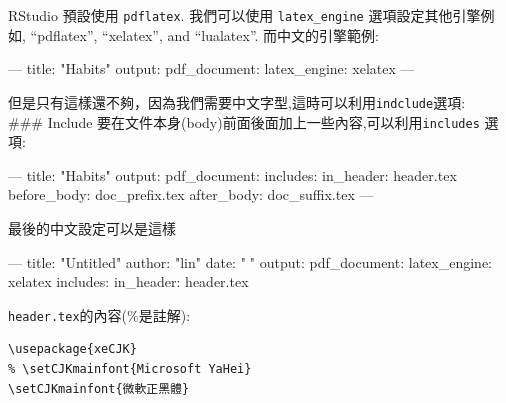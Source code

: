 \documentclass[]{book}
\newenvironment{Shaded}{\begin{snugshade}}{\end{snugshade}}
\newcommand{\AttributeTok}[1]{\textcolor[rgb]{0.77,0.63,0.00}{#1}}
\newcommand{\FunctionTok}[1]{\textcolor[rgb]{0.00,0.00,0.00}{#1}}
\newcommand{\OtherTok}[1]{\textcolor[rgb]{0.56,0.35,0.01}{#1}}
\newcommand{\StringTok}[1]{\textcolor[rgb]{0.31,0.60,0.02}{#1}}
\theoremstyle{definition}
\theoremstyle{definition}
\theoremstyle{definition}
\theoremstyle{remark}
\begin{document}
RStudio 預設使用 \texttt{pdflatex}. 我們可以使用 \texttt{latex\_engine}
選項設定其他引擎例如, ``pdflatex'', ``xelatex'', and ``lualatex''.
而中文的引擎範例:

\begin{Shaded}
\begin{Highlighting}[]
\OtherTok{---}
\FunctionTok{title:}\AttributeTok{ }\StringTok{"Habits"}
\FunctionTok{output:}
  \FunctionTok{pdf_document:}
    \FunctionTok{latex_engine:}\AttributeTok{ xelatex}
\OtherTok{---}
\end{Highlighting}
\end{Shaded}

但是只有這樣還不夠，因為我們需要中文字型,這時可以利用\texttt{indclude}選項:\\
\#\#\# Include
要在文件本身(body)前面後面加上一些內容,可以利用\texttt{includes} 選項:

\begin{Shaded}
\begin{Highlighting}[]
\OtherTok{---}
\FunctionTok{title:}\AttributeTok{ }\StringTok{"Habits"}
\FunctionTok{output:}
  \FunctionTok{pdf_document:}
    \FunctionTok{includes:}
      \FunctionTok{in_header:}\AttributeTok{ header.tex}
      \FunctionTok{before_body:}\AttributeTok{ doc_prefix.tex}
      \FunctionTok{after_body:}\AttributeTok{ doc_suffix.tex}
\OtherTok{---}
\end{Highlighting}
\end{Shaded}

最後的中文設定可以是這樣

\begin{Shaded}
\begin{Highlighting}[]

\OtherTok{---}
\FunctionTok{title:}\AttributeTok{ }\StringTok{"Untitled"}
\FunctionTok{author:}\AttributeTok{ }\StringTok{"lin"}
\FunctionTok{date:}\AttributeTok{ }\StringTok{""}
\FunctionTok{output:}
  \FunctionTok{pdf_document:}\AttributeTok{ }
    \FunctionTok{latex_engine:}\AttributeTok{ xelatex    }
    \FunctionTok{includes:}
      \FunctionTok{in_header:}\AttributeTok{ header.tex    }
\end{Highlighting}
\end{Shaded}

\texttt{header.tex}的內容(\%是註解):

\begin{verbatim}
\usepackage{xeCJK}  
% \setCJKmainfont{Microsoft YaHei}
\setCJKmainfont{微軟正黑體}
\end{verbatim}
\end{document}
